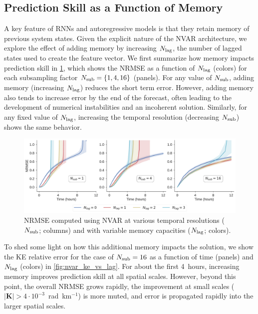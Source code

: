 \subsection{Prediction Skill as a Function of Memory}
\label{subsec:nvar-memory}

A key feature of RNNs and autoregressive models is that they retain memory of
previous system states.
Given the explicit nature of the NVAR architecture, we explore the effect of
adding memory by increasing $N_\text{lag}$, the number of lagged states used to create the
feature vector.
We first summarize how memory impacts prediction skill in
\cref{fig:nvar_nrmse_vs_lag}, which shows the NRMSE as a
function of $N_\text{lag}$ (colors) for each
subsampling factor $N_\text{sub} = \{1, 4, 16\}$ (panels).
For any value of $N_\text{sub}$, adding memory (increasing $N_\text{lag}$) reduces
the short term error.
However, adding memory also tends to increase error by the end of the forecast,
often leading to the development of numerical instabilities and an
incoherent solution.
Similarly, for any fixed value of $N_\text{lag}$, increasing the temporal resolution
(decreasing $N_\text{sub}$) shows the same behavior.

\begin{figure}
    \centering
    \includegraphics[width=\textwidth]{../figures/nvar_nrmse_vs_memory.pdf}
    \caption{NRMSE computed using NVAR at various temporal resolutions
        ($N_\text{sub}$; columns) and with variable memory capacities ($N_\text{lag}$;
        colors).
    }
    \label{fig:nvar_nrmse_vs_lag}
\end{figure}

To shed some light on how this additional memory impacts the solution,
we show the KE relative error
for the case of $N_\text{sub}=16$ as a function of time (panels) and $N_\text{lag}$ (colors)
in \cref{fig:nvar_ke_vs_lag}.
For about the first 4~hours, increasing memory improves prediction skill at all
spatial scales.
However, beyond this point, the overall NRMSE grows rapidly, the improvement
at small scales ($|\mathbf{K}|>4\cdot10^{-3}$~rad~km$^{-1}$) is more muted,
and error is propagated rapidly into the larger spatial scales.

